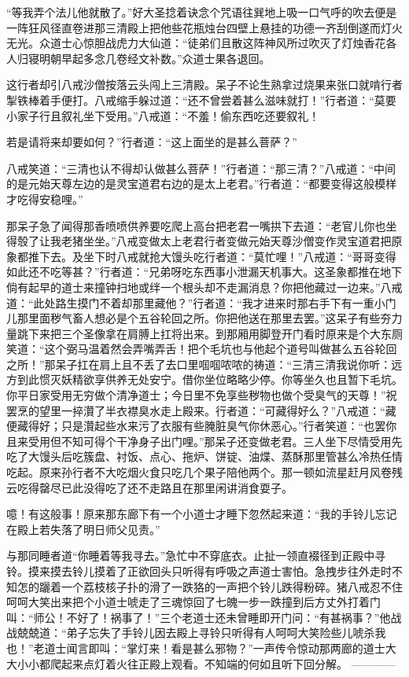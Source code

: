 \documentclass[12pt,UTF8]{ctexbook}
\begin{document}
“等我弄个法儿他就散了。”好大圣捻着诀念个咒语往巽地上吸一口气呼的吹去便是一阵狂风径直卷进那三清殿上把他些花瓶烛台四壁上悬挂的功德一齐刮倒遂而灯火无光。众道士心惊胆战虎力大仙道：“徒弟们且散这阵神风所过吹灭了灯烛香花各人归寝明朝早起多念几卷经文补数。”众道士果各退回。

这行者却引八戒沙僧按落云头闯上三清殿。呆子不论生熟拿过烧果来张口就啃行者掣铁棒着手便打。八戒缩手躲过道：“还不曾尝着甚么滋味就打！”行者道：“莫要小家子行且叙礼坐下受用。”八戒道：“不羞！偷东西吃还要叙礼！

若是请将来却要如何？”行者道：“这上面坐的是甚么菩萨？”

八戒笑道：“三清也认不得却认做甚么菩萨！”行者道：“那三清？”八戒道：“中间的是元始天尊左边的是灵宝道君右边的是太上老君。”行者道：“都要变得这般模样才吃得安稳哩。”

那呆子急了闻得那香喷喷供养要吃爬上高台把老君一嘴拱下去道：“老官儿你也坐得彀了让我老猪坐坐。”八戒变做太上老君行者变做元始天尊沙僧变作灵宝道君把原象都推下去。及坐下时八戒就抢大馒头吃行者道：“莫忙哩！”八戒道：“哥哥变得如此还不吃等甚？”行者道：“兄弟呀吃东西事小泄漏天机事大。这圣象都推在地下倘有起早的道士来撞钟扫地或绊一个根头却不走漏消息？你把他藏过一边来。”八戒道：“此处路生摸门不着却那里藏他？”行者道：“我才进来时那右手下有一重小门儿那里面秽气畜人想必是个五谷轮回之所。你把他送在那里去罢。”这呆子有些夯力量跳下来把三个圣像拿在肩膊上扛将出来。到那厢用脚登开门看时原来是个大东厕笑道：“这个弼马温着然会弄嘴弄舌！把个毛坑也与他起个道号叫做甚么五谷轮回之所！”那呆子扛在肩上且不丢了去口里啯啯哝哝的祷道：“三清三清我说你听：远方到此惯灭妖精欲享供养无处安宁。借你坐位略略少停。你等坐久也且暂下毛坑。你平日家受用无穷做个清净道士；今日里不免享些秽物也做个受臭气的天尊！”祝罢烹的望里一捽灒了半衣襟臭水走上殿来。行者道：“可藏得好么？”八戒道：“藏便藏得好；只是灒起些水来污了衣服有些腌脏臭气你休恶心。”行者笑道：“也罢你且来受用但不知可得个干净身子出门哩。”那呆子还变做老君。三人坐下尽情受用先吃了大馒头后吃簇盘、衬饭、点心、拖炉、饼锭、油煠、蒸酥那里管甚么冷热任情吃起。原来孙行者不大吃烟火食只吃几个果子陪他两个。那一顿如流星赶月风卷残云吃得罄尽已此没得吃了还不走路且在那里闲讲消食耍子。

噫！有这般事！原来那东廊下有一个小道士才睡下忽然起来道：“我的手铃儿忘记在殿上若失落了明日师父见责。”

与那同睡者道“你睡着等我寻去。”急忙中不穿底衣。止扯一领直裰径到正殿中寻铃。摸来摸去铃儿摸着了正欲回头只听得有呼吸之声道士害怕。急拽步往外走时不知怎的躧着一个荔枝核子扑的滑了一跌狢的一声把个铃儿跌得粉碎。猪八戒忍不住呵呵大笑出来把个小道士唬走了三魂惊回了七魄一步一跌撞到后方丈外打着门叫：“师公！不好了！祸事了！”三个老道士还未曾睡即开门问：“有甚祸事？”他战战兢兢道：“弟子忘失了手铃儿因去殿上寻铃只听得有人呵呵大笑险些儿唬杀我也！”老道士闻言即叫：“掌灯来！看是甚么邪物？”一声传令惊动那两廊的道士大大小小都爬起来点灯着火往正殿上观看。不知端的何如且听下回分解。
------------
\end{document}
